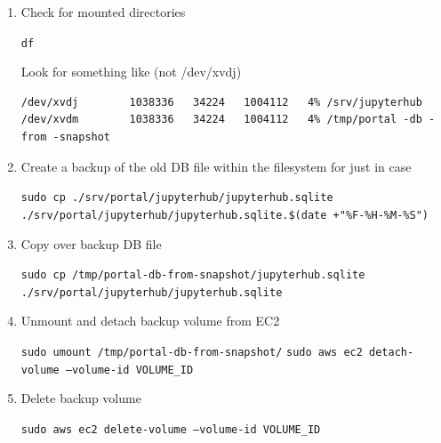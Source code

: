 \begin{enumerate}
\texttt{sudo mkdir -p /tmp/portal-db-from-snapshot/}
\texttt{sudo mount /dev/sdm /tmp/portal-db-from-snapshot/}

If you get an error message something like

\begin{quote}
/wrong fs type, bad option, bad superblock
\end{quote}

then you cannot mount the filesystem. AWS's way of handling volumes makes things difficult. \href{https://serverfault.com/questions/948408/mount-wrong-fs-type-bad-option-bad-superblock-on-dev-xvdf1-missing-codepage}{https://serverfault.com/questions/948408/mount-wrong-fs-type-bad-option-bad-superblock-on-dev-xvdf1-missing-codepage}

Since we are working with a temporay mount, run the following instead:

\texttt{sudo mount -t xfs -o nouuid /dev/sdm /tmp/portal-db-from-snapshot/}.


\item Check for mounted directories

\texttt{df}

Look for something like (not /dev/xvdj)

\begin{verbatim}
/dev/xvdj        1038336   34224   1004112   4% /srv/jupyterhub
/dev/xvdm        1038336   34224   1004112   4% /tmp/portal -db -from -snapshot
\end{verbatim}


\item Create a backup of the old DB file within the filesystem for just in case

\texttt{sudo cp ./srv/portal/jupyterhub/jupyterhub.sqlite ./srv/portal/jupyterhub/jupyterhub.sqlite.\$(date +"\%F-\%H-\%M-\%S")}


\item Copy over backup DB file

\texttt{sudo cp /tmp/portal-db-from-snapshot/jupyterhub.sqlite ./srv/portal/jupyterhub/jupyterhub.sqlite}


\item Unmount and detach backup volume from EC2

\texttt{sudo umount /tmp/portal-db-from-snapshot/}
\texttt{sudo aws ec2 detach-volume --volume-id VOLUME\_ID}


\item Delete backup volume

\texttt{sudo aws ec2 delete-volume --volume-id VOLUME\_ID}
\end{enumerate}